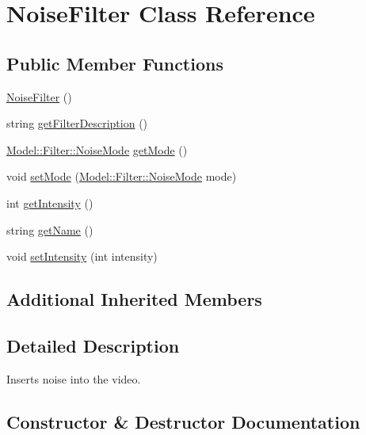 \hypertarget{classModel_1_1Filter_1_1NoiseFilter}{}\section{Noise\+Filter Class Reference}
\label{classModel_1_1Filter_1_1NoiseFilter}
\subsection*{Public Member Functions}
\begin{DoxyCompactItemize}
\item 
\hyperlink{classModel_1_1Filter_1_1NoiseFilter_ae0fddd4ce827a9428beb93c8fd39ea6a}{Noise\+Filter} ()
\item 
string \hyperlink{classModel_1_1Filter_1_1NoiseFilter_a62b7b60e24f92234393b840b35808e06}{get\+Filter\+Description} ()
\item 
\hyperlink{namespaceModel_1_1Filter_a0466e3095e9c21e5864d8964e9d7df59}{Model\+::\+Filter\+::\+Noise\+Mode} \hyperlink{classModel_1_1Filter_1_1NoiseFilter_a8cf1af8c1df3a0e626fbd81dd18563e3}{get\+Mode} ()
\item 
void \hyperlink{classModel_1_1Filter_1_1NoiseFilter_aa89a05210654576ff0a5b5fcf97d03b0}{set\+Mode} (\hyperlink{namespaceModel_1_1Filter_a0466e3095e9c21e5864d8964e9d7df59}{Model\+::\+Filter\+::\+Noise\+Mode} mode)
\item 
int \hyperlink{classModel_1_1Filter_1_1NoiseFilter_a708995fb1b6acb31ee0dfb0f4881e5b5}{get\+Intensity} ()
\item 
string \hyperlink{classModel_1_1Filter_1_1NoiseFilter_a11335e13e50af74108bf926dc1340b4b}{get\+Name} ()
\item 
void \hyperlink{classModel_1_1Filter_1_1NoiseFilter_ac8255ffbc46bb61acaa8fd23d0d260eb}{set\+Intensity} (int intensity)
\end{DoxyCompactItemize}
\subsection*{Additional Inherited Members}


\subsection{Detailed Description}
Inserts noise into the video. 

\subsection{Constructor \& Destructor Documentation}
\hypertarget{classModel_1_1Filter_1_1NoiseFilter_ae0fddd4ce827a9428beb93c8fd39ea6a}{}
